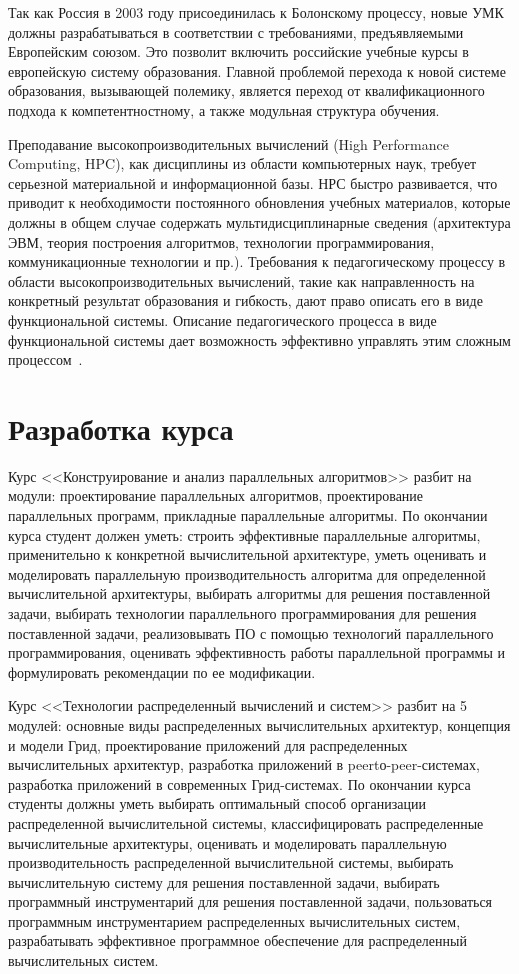 \documentclass[a4paper,11pt,draft]{article} %
\begin{document}
	Так как Россия в 2003 году присоединилась к Болонскому процессу, новые УМК должны разрабатываться в соответствии с требованиями, предъявляемыми Европейским союзом. Это позволит включить российские учебные курсы в европейскую систему образования. Главной проблемой
	перехода к новой системе образования, вызывающей полемику, является переход от квалификационного подхода к компетентностному, а также модульная структура обучения.
	
	Преподавание высокопроизводительных вычислений (High Performance Computing, HPC), как
	дисциплины из области компьютерных наук, требует серьезной материальной и информационной
	базы. НРС быстро развивается, что приводит к необходимости постоянного обновления учебных
	материалов, которые должны в общем случае содержать мультидисциплинарные сведения (архитектура ЭВМ, теория построения алгоритмов, технологии программирования, коммуникационные технологии и пр.). Требования к педагогическому процессу в области высокопроизводительных вычислений, такие как направленность на конкретный результат образования и гибкость,
	дают право описать его в виде функциональной системы. Описание педагогического процесса в
	виде функциональной системы дает возможность эффективно управлять этим сложным процессом~\cite{3}.
	
	\section{Разработка курса}
	Курс <<Конструирование и анализ параллельных алгоритмов>> разбит на модули: проектирование
	параллельных алгоритмов, проектирование параллельных программ, прикладные параллельные
	алгоритмы. По окончании курса студент должен уметь: строить эффективные параллельные 
	алгоритмы, применительно к конкретной вычислительной архитектуре, уметь оценивать и моделировать параллельную производительность алгоритма для определенной вычислительной архитектуры, выбирать алгоритмы для решения поставленной задачи, выбирать технологии параллельного программирования для решения поставленной задачи, реализовывать ПО с помощью
	технологий параллельного программирования, оценивать эффективность работы параллельной
	программы и формулировать рекомендации по ее модификации.
	
	Курс <<Технологии распределенный вычислений и систем>> разбит на 5 модулей: основные виды распределенных вычислительных архитектур, концепция и модели Грид, проектирование
	приложений для распределенных вычислительных архитектур, разработка приложений в peertо-peer-системах, разработка приложений в современных Грид-системах. По окончании курса
	студенты должны уметь выбирать оптимальный способ организации распределенной вычислительной системы, классифицировать распределенные вычислительные архитектуры, оценивать и
	моделировать параллельную производительность распределенной вычислительной системы, выбирать вычислительную систему для решения поставленной задачи, выбирать программный инструментарий для решения поставленной задачи, пользоваться программным инструментарием
	распределенных вычислительных систем, разрабатывать эффективное программное обеспечение
	для распределенный вычислительных систем.
	
\end{document}
